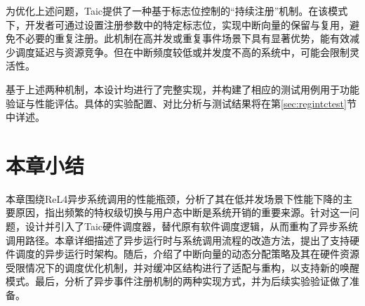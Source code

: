 为优化上述问题，Taic提供了一种基于标志位控制的“持续注册”机制。在该模式下，开发者可通过设置注册参数中的特定标志位，实现中断向量的保留与复用，避免不必要的重复注册。此机制在高并发或重复事件场景下具有显著优势，能有效减少调度延迟与资源竞争。但在中断频度较低或并发度不高的系统中，可能会限制灵活性。

基于上述两种机制，本设计均进行了完整实现，并构建了相应的测试用例用于功能验证与性能评估。具体的实验配置、对比分析与测试结果将在第\ref{sec:regintctest}节中详述。



\section{本章小结}

本章围绕ReL4异步系统调用的性能瓶颈，分析了其在低并发场景下性能下降的主要原因，指出频繁的特权级切换与用户态中断是系统开销的重要来源。针对这一问题，设计并引入了Taic硬件调度器，替代原有软件调度逻辑，从而重构了异步系统调用路径。本章详细描述了异步运行时与系统调用流程的改造方法，提出了支持硬件调度的异步运行时架构。随后，介绍了中断向量的动态分配策略及其在硬件资源受限情况下的调度优化机制，并对缓冲区结构进行了适配与重构，以支持新的唤醒模式。最后，分析了异步事件注册机制的两种实现方式，并为后续实验验证做了准备。